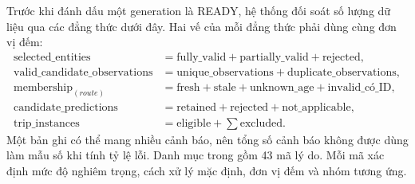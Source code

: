 Trước khi đánh dấu một generation là READY, hệ thống đối soát số lượng dữ liệu qua các đẳng thức dưới đây. Hai vế của mỗi đẳng thức phải dùng cùng đơn vị đếm:
\begin{align*}
\text{selected\_entities} &= \text{fully\_valid} + \text{partially\_valid} + \text{rejected},\\
\text{valid\_candidate\_observations} &= \text{unique\_observations} + \text{duplicate\_observations},\\
\text{membership}_{(route)} &= \text{fresh} + \text{stale} + \text{unknown\_age} + \text{invalid\_có\_ID},\\
\text{candidate\_predictions} &= \text{retained} + \text{rejected} + \text{not\_applicable},\\
\text{trip\_instances} &= \text{eligible} + \textstyle\sum \text{excluded}.
\end{align*}
Một bản ghi có thể mang nhiều cảnh báo, nên tổng số cảnh báo không được dùng làm mẫu số khi tính tỷ lệ lỗi. Danh mục  trong  gồm 43 mã lý do. Mỗi mã xác định mức độ nghiêm trọng, cách xử lý mặc định, đơn vị đếm và nhóm tương ứng.
